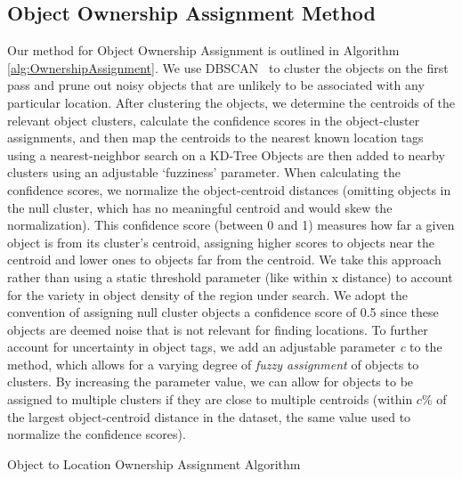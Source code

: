 \subsection{Object Ownership Assignment Method}

Our method for Object Ownership Assignment is outlined in Algorithm \ref{alg:OwnershipAssignment}. 
We use DBSCAN~\cite{Ester1996} to cluster the objects on the first pass and prune out noisy objects that are unlikely to be associated with any particular location.
After clustering the objects, we determine the centroids of the relevant object clusters, calculate the confidence scores in the object-cluster assignments, and then map the centroids to the nearest known location tags using a nearest-neighbor search on a KD-Tree
Objects are then added to nearby clusters using an adjustable `fuzziness' parameter.
When calculating the confidence scores, we normalize the object-centroid distances (omitting objects in the null cluster, which has no meaningful centroid and would skew the normalization). 
This confidence score (between 0 and 1) measures how far a given object is from its cluster's centroid, assigning higher scores to objects near the centroid and lower ones to objects far from the centroid. 
We take this approach rather than using a static threshold parameter (like within x distance) to account for the variety in object density of the region under search. 
We adopt the convention of assigning null cluster objects a confidence score of 0.5 since these objects are deemed noise that is not relevant for finding locations.
To further account for uncertainty in object tags, we add an adjustable parameter \textit{c} to the method, which allows for a varying degree of \textit{fuzzy assignment} of objects to clusters. 
By increasing the parameter value, we can allow for objects to be assigned to multiple clusters if they are close to multiple centroids (within \textit{$c\%$} of the largest object-centroid distance in the dataset, the same value used to normalize the confidence scores). 
\begin{algorithm}
    \caption{Object to Location Ownership Assignment Algorithm}
    \label{alg:OwnershipAssignment}
    \begin{algorithmic}
                                                           \State{- - - - - - - - - -}
                        
                                
                                    \EndFor
            \EndFor
            \EndFor
                            \EndFor 
        \EndProcedure
    \end{algorithmic}
\end{algorithm}

